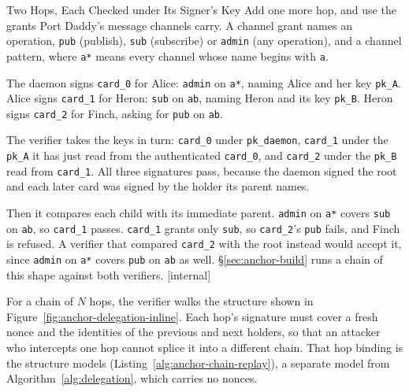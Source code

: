 \documentclass[11pt,a4paper]{article}
\theoremstyle{definition}
\begin{document}
\begin{pdexample}{Two Hops, Each Checked under Its Signer's Key}
\setlength{\parskip}{4pt plus 1pt}
Add one more hop, and use the grants Port Daddy's message channels carry. A
channel grant names an operation, \texttt{pub} (publish), \texttt{sub}
(subscribe) or \texttt{admin} (any operation), and a channel pattern, where
\texttt{a*} means every channel whose name begins with \texttt{a}.

The daemon signs \texttt{card\_0} for Alice: \texttt{admin} on \texttt{a*},
naming Alice and her key \texttt{pk\_A}. Alice signs \texttt{card\_1} for
Heron: \texttt{sub} on \texttt{ab}, naming Heron and its key \texttt{pk\_B}.
Heron signs \texttt{card\_2} for Finch, asking for \texttt{pub} on
\texttt{ab}.

The verifier takes the keys in turn: \texttt{card\_0} under
\texttt{pk\_daemon}, \texttt{card\_1} under the \texttt{pk\_A} it has just
read from the authenticated \texttt{card\_0}, and \texttt{card\_2} under the
\texttt{pk\_B} read from \texttt{card\_1}. All three signatures pass, because
the daemon signed the root and each later card was signed by the holder its
parent names.

Then it compares each child with its immediate parent. \texttt{admin} on
\texttt{a*} covers \texttt{sub} on \texttt{ab}, so \texttt{card\_1} passes.
\texttt{card\_1} grants only \texttt{sub}, so \texttt{card\_2}'s
\texttt{pub} fails, and Finch is refused. A verifier that compared
\texttt{card\_2} with the root instead would accept it, since \texttt{admin}
on \texttt{a*} covers \texttt{pub} on \texttt{ab} as well.
\S\ref{sec:anchor-build} runs a chain of this shape against both
verifiers. [internal]
\end{pdexample}

For a chain of $N$ hops, the verifier walks the structure shown in Figure~\ref{fig:anchor-delegation-inline}. Each hop's signature must cover a fresh nonce and the identities of the previous and next holders, so that an attacker who intercepts one hop cannot splice it into a different chain. That hop binding is the structure  models (Listing~\ref{alg:anchor-chain-replay}), a separate model from Algorithm~\ref{alg:delegation}, which carries no nonces.
\end{document}
